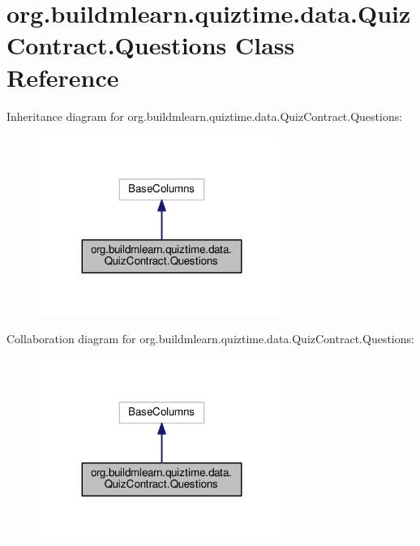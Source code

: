 \hypertarget{classorg_1_1buildmlearn_1_1quiztime_1_1data_1_1QuizContract_1_1Questions}{}\section{org.\+buildmlearn.\+quiztime.\+data.\+Quiz\+Contract.\+Questions Class Reference}
\label{classorg_1_1buildmlearn_1_1quiztime_1_1data_1_1QuizContract_1_1Questions}


Inheritance diagram for org.\+buildmlearn.\+quiztime.\+data.\+Quiz\+Contract.\+Questions\+:
\nopagebreak
\begin{figure}[H]
\begin{center}
\leavevmode
\includegraphics[width=227pt]{classorg_1_1buildmlearn_1_1quiztime_1_1data_1_1QuizContract_1_1Questions__inherit__graph}
\end{center}
\end{figure}


Collaboration diagram for org.\+buildmlearn.\+quiztime.\+data.\+Quiz\+Contract.\+Questions\+:
\nopagebreak
\begin{figure}[H]
\begin{center}
\leavevmode
\includegraphics[width=227pt]{classorg_1_1buildmlearn_1_1quiztime_1_1data_1_1QuizContract_1_1Questions__coll__graph}
\end{center}
\end{figure}
